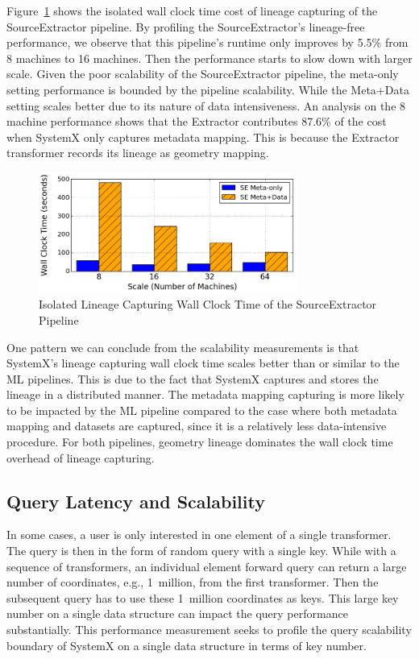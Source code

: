 \documentclass{sig-alternate}
\begin{document}
Figure~\ref{fig:SE-overhead} shows the isolated wall clock time cost of lineage capturing of the SourceExtractor pipeline.
By profiling the SourceExtractor's lineage-free performance, we observe that this pipeline's runtime only improves by 5.5\% from 8 machines
to 16 machines. Then the performance starts to slow down with larger scale.
Given the poor scalability of the SourceExtractor pipeline, the meta-only setting performance is bounded by the pipeline scalability.
While the Meta+Data setting scales better due to its nature of data intensiveness.
An analysis on the 8 machine performance shows that the Extractor contributes 87.6\% of the cost when SystemX only captures metadata mapping.
This is because the Extractor transformer records its lineage as geometry mapping.
\begin{figure}[t]
\begin{center}
    \includegraphics[width=85mm]{pictures/Overhead-Time-SE}
\caption {Isolated Lineage Capturing Wall Clock Time of the SourceExtractor Pipeline
    \label{fig:SE-overhead}
}
\end{center}
\end{figure}

One pattern we can conclude from the scalability measurements is that SystemX's lineage capturing wall clock 
time scales better than or similar to the ML pipelines.
This is due to the fact that SystemX captures and stores the lineage in a distributed manner. 
The metadata mapping capturing is more likely to be impacted by the ML pipeline compared to the case where both metadata
mapping and datasets are captured, since it is a relatively less data-intensive procedure.
For both pipelines, geometry lineage dominates the wall clock time overhead of lineage capturing.


\subsection{Query Latency and Scalability}
In some cases, a user is only interested in one element of a single transformer.
The query is then in the form of random query with a single key.
While with a sequence of transformers, an individual element forward query 
can return a large number of coordinates, e.g., 1~million, from the first transformer. 
Then the subsequent query has to use these 1~million coordinates as keys.
This large key number on a single data structure can impact the query performance substantially.  
This performance measurement seeks to profile the query scalability boundary of SystemX on a single data structure in terms of key number. 
\end{document}
